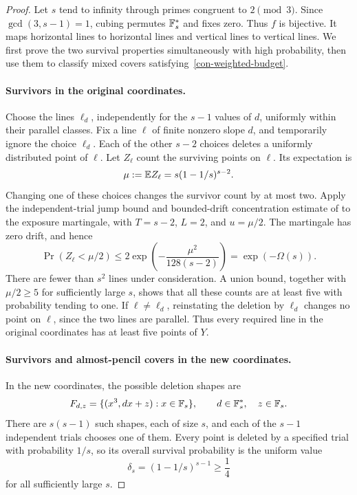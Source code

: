 \begin{proof}
Let \(s\) tend to infinity through primes congruent to \(2\pmod3\).
Since
\(\gcd(3,s-1)=1\), cubing permutes \(\mathbb F_s^*\) and fixes zero.
Thus \(f\) is bijective.  It maps horizontal lines to horizontal
lines and vertical lines to vertical lines.  We first prove the two
survival properties simultaneously with high probability, then use
them to classify mixed covers satisfying~\eqref{con-weighted-budget}.

\paragraph{Survivors in the original coordinates.}
Choose the lines \(\ell_d\), independently for the \(s-1\) values
of \(d\), uniformly within their parallel classes.  Fix a line
\(\ell\) of finite nonzero slope \(d\), and temporarily ignore the
choice \(\ell_d\).  Each of the other \(s-2\) choices deletes a
uniformly distributed point of \(\ell\).  Let \(Z_\ell\) count
the surviving points on \(\ell\).  Its expectation is
\[
 \mu:=\mathbb E Z_\ell=s(1-1/s)^{s-2}.
\]
Changing one of these choices changes the survivor count by at most
two.  Apply the independent-trial jump bound and bounded-drift
concentration estimate of
\cite[Lemmas~A.2--A.3]{OpenAI2026Balanced} to the exposure martingale,
with \(T=s-2\), \(L=2\), and \(u=\mu/2\).  The martingale has
zero drift, and hence
\[
 \Pr(Z_\ell<\mu/2)
 \le 2\exp\left(-\frac{\mu^2}{128(s-2)}\right)
 =\exp(-\Omega(s)).
\]
There are fewer than \(s^2\) lines under consideration.  A union
bound, together with \(\mu/2\ge5\) for sufficiently large \(s\),
shows that all these counts are at least five with probability tending
to one.  If \(\ell\ne\ell_d\), reinstating the deletion by
\(\ell_d\) changes no point on \(\ell\), since the two lines are
parallel.  Thus every required line in the original coordinates has
at least five points of \(Y\).

\paragraph{Survivors and almost-pencil covers in the new coordinates.}
In the new coordinates, the possible deletion shapes are
\[
 F_{d,z}=\{(x^3,dx+z):x\in\mathbb F_s\},
 \qquad d\in\mathbb F_s^*,\quad z\in\mathbb F_s.
\]
There are \(s(s-1)\) such shapes, each of size \(s\), and each of
the \(s-1\) independent trials chooses one of them.  Every point
is deleted by a specified trial with probability \(1/s\), so its
overall survival probability is the uniform value
\[
 \delta_s=(1-1/s)^{s-1}\ge\frac14
\]
for all sufficiently large \(s\).


\end{proof}
